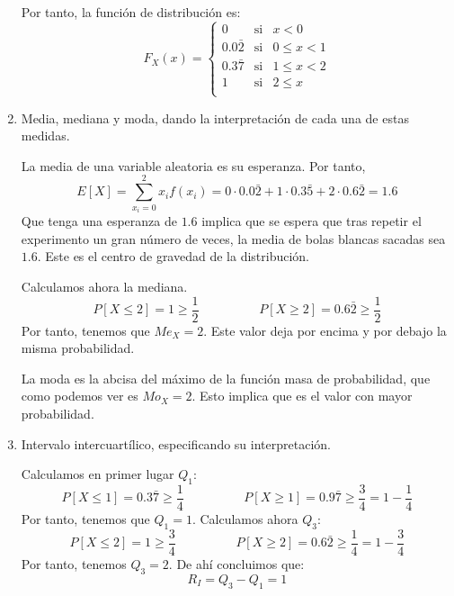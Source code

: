 \begin{ejercicio}
\begin{enumerate}
        Por tanto, la función de distribución es:
        \begin{equation*}
            F_X(x) = \left\{\begin{array}{ccc}
                0 & \text{si} & x<0 \\
                0.0\bar{2} & \text{si} & 0\leq x < 1  \\
                0.3\bar{7} & \text{si} & 1\leq x < 2 \\
                1 & \text{si} & 2\leq x \\
            \end{array}\right.
        \end{equation*}
        
        \item Media, mediana y moda, dando la interpretación de cada una de estas medidas.

        La media de una variable aleatoria es su esperanza. Por tanto,
        \begin{equation*}
            E[X] = \sum_{x_i=0}^2 x_if(x_i) = 0\cdot 0.0\bar{2} + 1\cdot 0.3\bar{5} + 2\cdot 0.6\bar{2} = 1.6
        \end{equation*}
        Que tenga una esperanza de $1.6$ implica que se espera que tras repetir el experimento un gran número de veces, la media de bolas blancas sacadas sea $1.6$. Este es el centro de gravedad de la distribución.

        Calculamos ahora la mediana.
        \begin{equation*}
            P[X\leq 2] = 1 \geq \frac{1}{2} \hspace{2cm}
            P[X\geq 2] = 0.6\bar{2} \geq \frac{1}{2}
        \end{equation*}
        Por tanto, tenemos que $Me_X = 2$. Este valor deja por encima y por debajo la misma probabilidad.

        La moda es la abcisa del máximo de la función masa de probabilidad, que como podemos ver es $Mo_X = 2$. Esto implica que es el valor con mayor probabilidad.
        
        \item Intervalo intercuartílico, especificando su interpretación.

        Calculamos en primer lugar $Q_1$:
        \begin{equation*}
            P[X\leq 1] = 0.3\bar{7} \geq \frac{1}{4} \hspace{2cm}
            P[X\geq 1] = 0.9\bar{7} \geq \frac{3}{4} = 1-\frac{1}{4}
        \end{equation*}
        Por tanto, tenemos que $Q_1=1$. Calculamos ahora $Q_3$:
        \begin{equation*}
            P[X\leq 2] = 1 \geq \frac{3}{4} \hspace{2cm}
            P[X\geq 2] = 0.6\bar{2} \geq \frac{1}{4} = 1-\frac{3}{4}
        \end{equation*}
        Por tanto, tenemos $Q_3 = 2$. De ahí concluimos que:
        \begin{equation*}
            R_I = Q_3 - Q_1 = 1
        \end{equation*}


\end{enumerate}
\end{ejercicio}
